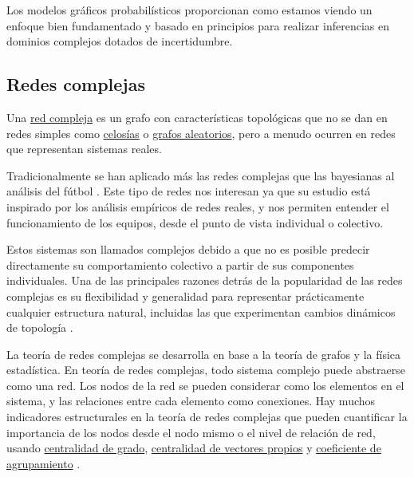 Los modelos gráficos probabilísticos proporcionan como estamos viendo un enfoque bien fundamentado y 
basado en principios para realizar inferencias en dominios complejos dotados de incertidumbre. 

\subsection{Redes complejas}
\begin{definicion} \label{def:CN}
    Una \href{https://en.wikipedia.org/wiki/Complex_network}{red compleja} 
    es un grafo con características topológicas que no se dan 
    en redes simples como \href{https://en.wikipedia.org/wiki/Lattice_(order)}{celosías} o 
    \href{https://mathworld.wolfram.com/RandomGraph.html}{grafos aleatorios}, pero a menudo ocurren en redes que 
    representan sistemas reales. 
\end{definicion}

Tradicionalmente se han aplicado más las redes complejas que las bayesianas al análisis del fútbol \cite{ARRIAZAARDILES2018236}.
Este tipo de redes nos interesan ya que su estudio está inspirado por los análisis empíricos de redes reales, y 
nos permiten entender el funcionamiento de los equipos, desde el punto de vista individual o colectivo.

Estos sistemas son llamados complejos debido a que no es posible predecir directamente su 
comportamiento colectivo a partir de sus componentes individuales. Una de las principales razones detrás de 
la popularidad de las redes complejas es su flexibilidad
y generalidad para representar prácticamente cualquier estructura natural, incluidas las que experimentan 
cambios dinámicos de topología \cite{CN-review}.

La teoría de redes complejas se desarrolla en base a la teoría de grafos y la física estadística. En teoría de 
redes complejas, todo sistema complejo puede abstraerse como una red. Los nodos de la red se pueden 
considerar como los elementos en el sistema, y las relaciones
entre cada elemento como conexiones. Hay muchos indicadores estructurales
en la teoría de redes complejas que pueden cuantificar la importancia de los nodos desde el nodo mismo o el
nivel de relación de red, usando \href{https://link.springer.com/10.1007%2F978-1-4419-9863-7_935}{centralidad de grado}, 
\href{https://neo4j.com/docs/graph-data-science/current/algorithms/eigenvector-centrality/}{centralidad de vectores propios} 
y \href{https://en.wikipedia.org/wiki/Clustering_coefficient}{coeficiente de agrupamiento} \cite{albert2002statistical}.
 
